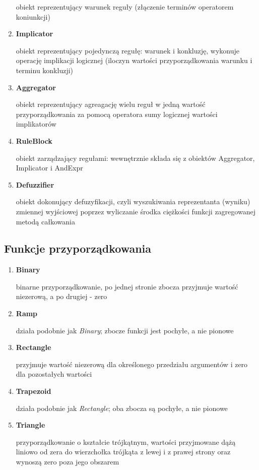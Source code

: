 \documentclass{article}
\begin{document}
\begin{enumerate}
  obiekt reprezentujący warunek reguły (złączenie terminów operatorem koniunkcji)

\item \textbf{Implicator}

  obiekt reprezentujący pojedynczą regułę: warunek i konkluzję, wykonuje
  operację implikacji logicznej (iloczyn wartości przyporządkowania warunku i
  terminu konkluzji)

\item \textbf{Aggregator}

  obiekt reprezentujący agreagację wielu reguł w jedną wartość przyporządkowania
  za pomocą operatora sumy logicznej wartości implikatorów

\item \textbf{RuleBlock}

  obiekt zarządzający regułami: wewnętrznie składa się z obiektów Aggregator,
  Implicator i AndExpr

\item \textbf{Defuzzifier}

  obiekt dokonujący defuzyfikacji, czyli wyszukiwania reprezentanta (wyniku) zmiennej
  wyjściowej poprzez wyliczanie środka ciężkości funkcji zagregowanej metodą całkowania

\end{enumerate}

\subsection {Funkcje przyporządkowania}

\begin{enumerate}
\item \textbf{Binary}

  binarne przyporządkowanie, po jednej stronie zbocza przyjmuje wartość
  niezerową, a po drugiej - zero

\item \textbf{Ramp}

  działa podobnie jak \emph{Binary}; zbocze funkcji jest pochyłe, a nie pionowe

\item \textbf{Rectangle}

  przyjmuje wartość niezerową dla określonego przedziału argumentów i zero dla
  pozostałych wartości

\item \textbf{Trapezoid}

  działa podobnie jak \emph{Rectangle}; oba zbocza są pochyłe, a nie pionowe

\item \textbf{Triangle}

  przyporządkowanie o kształcie trójkątnym, wartości przyjmowane dążą liniowo od zera do wierzchołka
  trójkąta z lewej i z prawej strony oraz wynoszą zero poza jego obszarem

\end{enumerate}
\end{document}
